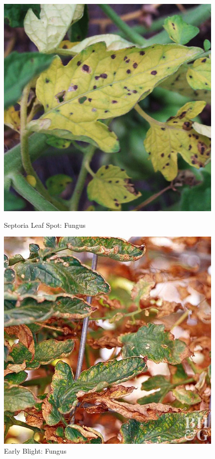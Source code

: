 \begin{figure}[H]
    \centering
    \begin{minipage}[b]{0.45\textwidth}
        \includegraphics[width=\textwidth]{user-view/sick_0.jpg}
        \caption{Septoria Leaf Spot: Fungus}
        \label{fig:septoria}
    \end{minipage}
    \hfill
    \begin{minipage}[b]{0.45\textwidth}
        \includegraphics[width=\textwidth]{user-view/sick_1.jpg}
        \caption{Early Blight: Fungus}
        \label{fig:blight}
    \end{minipage}
\end{figure}

